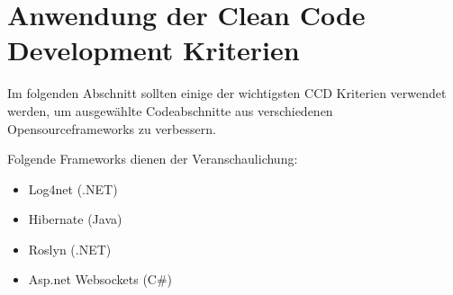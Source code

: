 \chapter{Anwendung der Clean Code Development Kriterien}

\SuperPar Im folgenden Abschnitt sollten einige der wichtigsten CCD Kriterien verwendet werden, um ausgewählte Codeabschnitte aus verschiedenen Opensourceframeworks zu verbessern.

\SuperPar Folgende Frameworks dienen der Veranschaulichung:

\begin{itemize}
	\item Log4net (.NET)
	\item Hibernate (Java)
	\item Roslyn (.NET)
	\item Asp.net Websockets (C\#)
\end{itemize}
\newpage